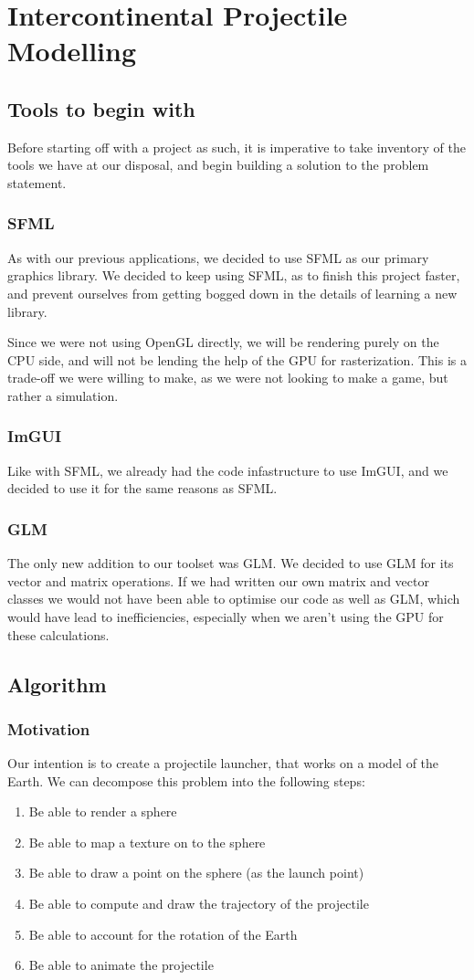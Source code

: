 \documentclass[main.tex]{subfiles}
\begin{document}
 
\section{Intercontinental Projectile Modelling}
\subsection{Tools to begin with}
Before starting off with a project as such, it is imperative to take inventory of the tools we have at our disposal, 
and begin building a solution to the problem statement.
\subsubsection{SFML}
As with our previous applications, we decided to use SFML as our primary graphics library.
We decided to keep using SFML, as to finish this project faster\@, and 
prevent ourselves from getting bogged down in the details of learning a new library.

Since we were not using OpenGL directly, we will be rendering purely on the CPU side, and will not be lending the help of the GPU
for rasterization. This is a trade-off we were willing to make, as we were not looking to make a game, but rather a simulation.
\subsubsection{ImGUI}
Like with SFML, we already had the code infastructure to use ImGUI, and we decided to use it for the same reasons as SFML\@.
\subsubsection{GLM}
The only new addition to our toolset was GLM\@. We decided to use GLM for its vector and matrix operations. If we had written our own matrix and vector classes 
we would not have been able to optimise our code as well as GLM\@, which would have lead to inefficiencies, especially when we aren't using the GPU for these calculations.
\subsection{Algorithm}
\subsubsection{Motivation}
Our intention is to create a projectile launcher, that works on a model of the Earth. We can decompose this problem into the following steps:
\begin{enumerate}
    \item Be able to render a sphere 
    \item Be able to map a texture on to the sphere
    \item Be able to draw a point on the sphere (as the launch point)
    \item Be able to compute and draw the trajectory of the projectile
    \item Be able to account for the rotation of the Earth
    \item Be able to animate the projectile
\end{enumerate} 
\end{document}
